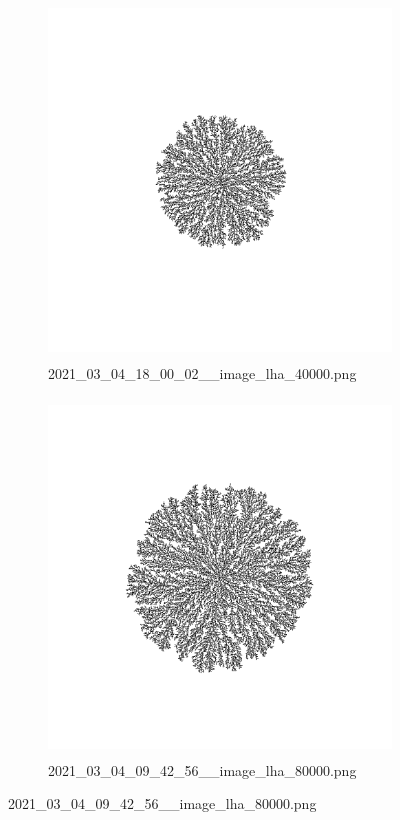 \documentclass[12pt,a4paper]{scrartcl}
\newcommand{\1}{\mathbbm{1}}
\theoremstyle{definition}
\numberwithin{equation}{section}
\begin{document}
\begin{figure}[]
	\centering
	\begin{subfigure}[]{0.48\textwidth}
		\centerline{\includegraphics[height=9.5cm]{images/ia/2021_03_04_18_00_02__image_lha_40000.png}}
		\captionsetup{labelformat=empty}
		\caption{2021\_03\_04\_18\_00\_02\_\_image\_lha\_40000.png} 
	\end{subfigure}
	\begin{subfigure}[]{0.48\textwidth}
		\centerline{\includegraphics[height=9.5cm]{images/ia/2021_03_04_09_42_56__image_lha_80000.png}}
		\captionsetup{labelformat=empty}
		\caption{2021\_03\_04\_09\_42\_56\_\_image\_lha\_80000.png} 
	\end{subfigure}
\end{figure}
\end{document}
